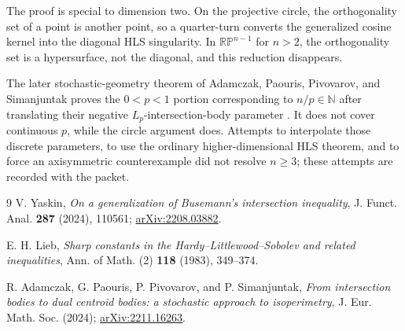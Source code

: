 \documentclass[10pt]{article}
\begin{document}
The proof is special to dimension two.  On the projective circle, the
orthogonality set of a point is another point, so a quarter-turn converts
the generalized cosine kernel into the diagonal HLS singularity.  In
$\mathbb{RP}^{n-1}$ for $n>2$, the orthogonality set is a hypersurface, not
the diagonal, and this reduction disappears.

The later stochastic-geometry theorem of Adamczak, Paouris, Pivovarov, and
Simanjuntak proves the $0<p<1$ portion corresponding to
$n/p\in\mathbb N$ after translating their negative $L_p$-intersection-body
parameter \cite{APPS}.  It does not cover continuous $p$, while the circle
argument does.  Attempts to interpolate those discrete parameters, to use
the ordinary higher-dimensional HLS theorem, and to force an axisymmetric
counterexample did not resolve $n\geq3$; these attempts are recorded with
the packet.

\begin{thebibliography}{9}
V. Yaskin,
\emph{On a generalization of Busemann's intersection inequality},
J. Funct. Anal. \textbf{287} (2024), 110561;
\href{https://arxiv.org/abs/2208.03882}{arXiv:2208.03882}.

E. H. Lieb,
\emph{Sharp constants in the Hardy--Littlewood--Sobolev and related
inequalities}, Ann. of Math. (2) \textbf{118} (1983), 349--374.

R. Adamczak, G. Paouris, P. Pivovarov, and P. Simanjuntak,
\emph{From intersection bodies to dual centroid bodies: a stochastic
approach to isoperimetry},
J. Eur. Math. Soc. (2024);
\href{https://arxiv.org/abs/2211.16263}{arXiv:2211.16263}.
\end{thebibliography}
\end{document}
